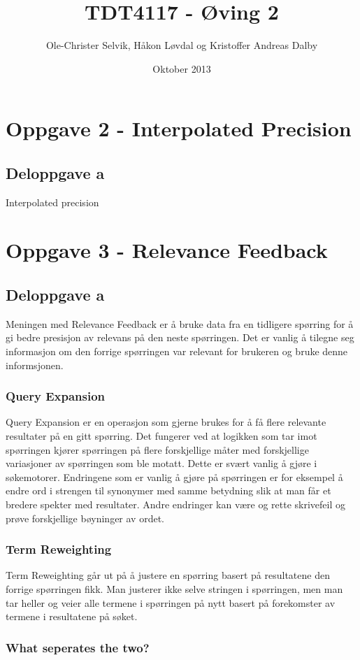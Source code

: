 \documentclass[]{article}
\begin{document}
\title{TDT4117 - Øving 2}
\author{Ole-Christer Selvik, Håkon Løvdal og Kristoffer Andreas Dalby}
\date{Oktober 2013}
\maketitle

\pagebreak



\section*{Oppgave 2 - Interpolated Precision}
\subsection*{Deloppgave a}
Interpolated precision


\pagebreak
\section*{Oppgave 3 - Relevance Feedback}
\subsection*{Deloppgave a}
Meningen med Relevance Feedback er å bruke data fra en tidligere spørring for å gi bedre presisjon av relevans på den neste spørringen. Det er vanlig å tilegne seg informasjon om den forrige spørringen var relevant for brukeren og bruke denne informsjonen. 
\subsubsection*{Query Expansion}
Query Expansion er en operasjon som gjerne brukes for å få flere relevante resultater på en gitt spørring. Det fungerer ved at logikken som tar imot spørringen kjører spørringen på flere forskjellige måter med forskjellige variasjoner av spørringen som ble motatt. Dette er svært vanlig å gjøre i søkemotorer. Endringene som er vanlig å gjøre på spørringen er for eksempel å endre ord i strengen til synonymer med samme betydning slik at man får et bredere spekter med resultater. Andre endringer kan være og rette skrivefeil og prøve forskjellige bøyninger av ordet.
\subsubsection*{Term Reweighting}
Term Reweighting går ut på å justere en spørring basert på resultatene den forrige spørringen fikk. Man justerer ikke selve stringen i spørringen, men man tar heller og veier alle termene i spørringen på nytt basert på forekomster av termene i resultatene på søket.
\subsubsection*{What seperates the two?}



\pagebreak
\end{document}
